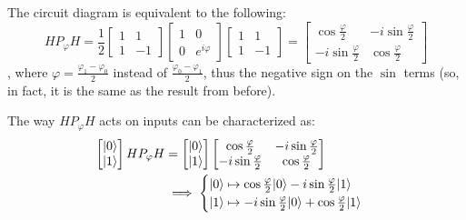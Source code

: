 \documentclass[12pt]{article}
\begin{document}
\begin{proposition}
The circuit diagram is equivalent to the following: $$
HP_\varphi H = \frac{1}{2}\begin{bmatrix}
    1 & 1\\
    1 & -1
\end{bmatrix}\begin{bmatrix}
    1 & 0 \\
    0 & e^{i\varphi}
\end{bmatrix}\begin{bmatrix}
    1 & 1\\
    1 & -1
\end{bmatrix} = \begin{bmatrix}
    \cos\frac{\varphi}{2} & -i \sin\frac{\varphi}{2}\\
    -i \sin\frac{\varphi}{2} & \cos\frac{\varphi}{2}
\end{bmatrix}
$$, where $\varphi = \frac{\varphi_1 - \varphi_0}{2}$ instead of $\frac{\varphi_0 - \varphi_1}{2}$, thus the negative sign on the $\sin$ terms (so, in fact, it is the same as the result from before).

The way $HP_\varphi H$ acts on inputs can be characterized as: $$
\begin{aligned}
\begin{bmatrix}
\Ket{0}\\
\Ket{1}
\end{bmatrix} HP_\varphi H
    &= \begin{bmatrix}
        \Ket{0}\\
        \Ket{1}
        \end{bmatrix}\begin{bmatrix}
            \cos\frac{\varphi}{2} & -i \sin\frac{\varphi}{2}\\
            -i \sin\frac{\varphi}{2} & \cos\frac{\varphi}{2}
        \end{bmatrix} \\
    &\implies \begin{cases}
        \Ket{0}\mapsto \cos\frac{\varphi}{2}\Ket{0} - i\sin\frac{\varphi}{2}\Ket{1}\\
        \Ket{1}\mapsto -i\sin\frac{\varphi}{2}\Ket{0} + \cos\frac{\varphi}{2}\Ket{1}
        \end{cases}
\end{aligned}
$$
\end{proposition}
\end{document}

